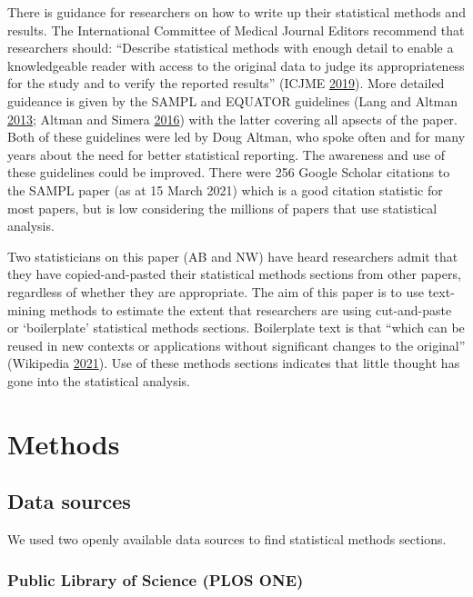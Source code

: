 \documentclass[
]{article}
\begin{document}
There is guidance for researchers on how to write up their statistical methods and results.
The International Committee of Medical Journal Editors recommend that researchers should: ``Describe statistical methods with enough detail to enable a knowledgeable reader with access to the original data to judge its appropriateness for the study and to verify the reported results'' (ICJME \protect\hyperlink{ref-ICMJE2019}{2019}).
More detailed guideance is given by the SAMPL and EQUATOR guidelines (Lang and Altman \protect\hyperlink{ref-Lang2013}{2013}; Altman and Simera \protect\hyperlink{ref-Altman2016}{2016}) with the latter covering all apsects of the paper. Both of these guidelines were led by Doug Altman, who spoke often and for many years about the need for better statistical reporting.
The awareness and use of these guidelines could be improved. There were 256 Google Scholar citations to the SAMPL paper (as at 15 March 2021) which is a good citation statistic for most papers, but is low considering the millions of papers that use statistical analysis.

Two statisticians on this paper (AB and NW) have heard researchers admit that they have copied-and-pasted their statistical methods sections from other papers, regardless of whether they are appropriate.
The aim of this paper is to use text-mining methods to estimate the extent that researchers are using cut-and-paste or `boilerplate' statistical methods sections.
Boilerplate text is that ``which can be reused in new contexts or applications without significant changes to the original'' (Wikipedia \protect\hyperlink{ref-Wikipedia}{2021}).
Use of these methods sections indicates that little thought has gone into the statistical analysis.

\hypertarget{methods}{%
\section{Methods}\label{methods}}

\hypertarget{data-sources}{%
\subsection{Data sources}\label{data-sources}}

We used two openly available data sources to find statistical methods sections.

\hypertarget{public-library-of-science-plos-one}{%
\subsubsection{Public Library of Science (PLOS ONE)}\label{public-library-of-science-plos-one}}
\end{document}
